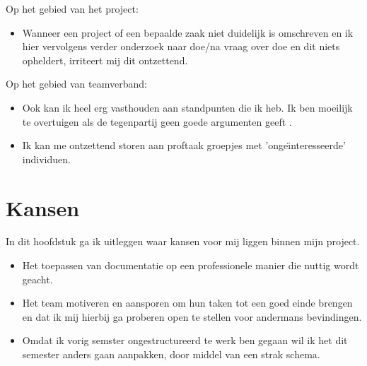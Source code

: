 \documentclass[11pt, twoside]{report}
\begin{document}
    Op het gebied van het project:
    \begin{itemize}
        \item[] Wanneer een project of een bepaalde zaak niet duidelijk is omschreven en ik hier vervolgens verder onderzoek naar doe/na vraag over doe en dit niets opheldert, irriteert mij dit ontzettend.
    \end{itemize}

    Op het gebied van teamverband:
    \begin{itemize}
        \item[] Ook kan ik heel erg vasthouden aan standpunten die ik heb. Ik ben moeilijk te overtuigen als de tegenpartij geen goede argumenten geeft .
        \item[] Ik kan me ontzettend storen aan proftaak groepjes met 'onge\"{\i}nteresseerde' individuen.
    \end{itemize}


    \section{Kansen}\label{sec:kansen}
    In dit hoofdstuk ga ik uitleggen waar kansen voor mij liggen binnen mijn project.

    \begin{itemize}
        \item[] Het toepassen van documentatie op een professionele manier die nuttig wordt geacht.
        \item[] Het team motiveren en aansporen om hun taken tot een goed einde brengen en dat ik mij hierbij ga proberen open te stellen voor andermans bevindingen.
        \item[] Omdat ik vorig semster ongestructureerd te werk ben gegaan wil ik het dit semester anders gaan aanpakken, door middel van een strak schema.
    \end{itemize}
\end{document}
